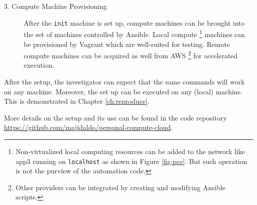\begin{description}
\begin{description}
  \end{description}


\item[3. Compute Machine Provisioning] \hfill

After the \texttt{init} machine is set up, compute machines can be brought into the set of machines controlled by \textsf{Ansible}.
%
Local compute%
\footnote{
Non-virtualized local computing resources can be added to the network like \textsf{app3} running on \texttt{localhost} as shown in Figure \ref{fig:pcc}.
%
But such operation is not the purview of the automation code.
}
machines can be provisioned by \textsf{Vagrant} which are well-suited for testing.
%
Remote compute machines can be acquired as well from \textsf{AWS}%
\footnote{
Other providers can be integrated by creating and modifying \textsf{Ansible} scripts.
}
for accelerated execution.


\end{description}


After the setup, the investigator can expect that the same commands will work on any machine.
%
Moreover, the set up can be executed on any (local) machine.
%
This is demonstrated in Chapter \ref{ch:reproduce}.


More details on the setup and its use can be found in the code repository \url{https://github.com/majidaldo/personal-compute-cloud}.









